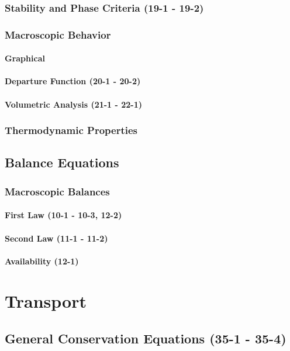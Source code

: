 \documentclass{mitqualif}
\begin{document}
\subsection{Stability and Phase Criteria (19-1 - 19-2)}
\subsection{Macroscopic Behavior}
\subsubsection{Graphical}
\subsubsection{Departure Function (20-1 - 20-2)}
\subsubsection{Volumetric Analysis (21-1 - 22-1)}
\subsection{Thermodynamic Properties}
\section{Balance Equations}
\subsection{Macroscopic Balances}
\subsubsection{First Law (10-1 - 10-3, 12-2)}
\subsubsection{Second Law (11-1 - 11-2)}
\subsubsection{Availability (12-1)}
\newpage
\chapter{Transport}
\section{General Conservation Equations (35-1 - 35-4)}
\end{document}
